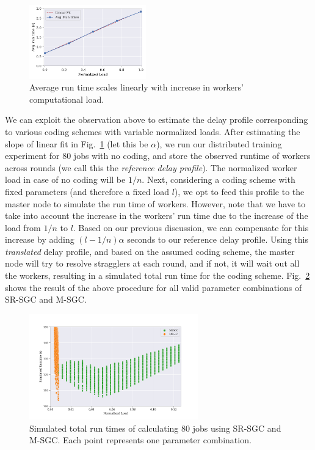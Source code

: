 \begin{figure}[h]
	\centering
	\includegraphics[width=0.45\textwidth]{figures/ch2/5.pdf}
	\caption{Average run time scales linearly with increase in workers' computational load.}
	\label{fig:base_comp}
\end{figure}

We can exploit the observation above to estimate the delay profile corresponding to various coding schemes with variable normalized loads. After estimating the slope of linear fit in Fig.~\ref{fig:base_comp} (let this be $\alpha$), we run our distributed training experiment for $80$ jobs with no coding, and store the observed runtime of workers across rounds (we call this the \textit{reference delay profile}). The normalized worker load in case of no coding will be $1/n$. 
Next, considering a coding scheme with fixed parameters (and therefore a fixed load $l$), we opt to feed this profile to the master node to simulate the run time of workers. However, note that we have to take into account the increase in the workers' run time due to the increase of the load from $1/n$ to $l$. Based on our previous discussion, we can compensate for this increase by adding $(l - 1/n) \alpha$ seconds to our reference delay profile. Using this \textit{translated} delay profile, and based on the assumed coding scheme, the master node will try to resolve stragglers at each round, and if not, it will wait out all the workers, resulting in a simulated total run time for the coding scheme. Fig.~\ref{fig:allparams} shows the result of the above procedure for all valid parameter combinations of SR-SGC and M-SGC. 

\begin{figure}[h]
	\centering
	\includegraphics[width=0.65\textwidth]{figures/ch2/6.png}
	\caption{Simulated total run times of calculating 80 jobs using SR-SGC and M-SGC. Each point represents one parameter combination.}
	\label{fig:allparams}
\end{figure}

